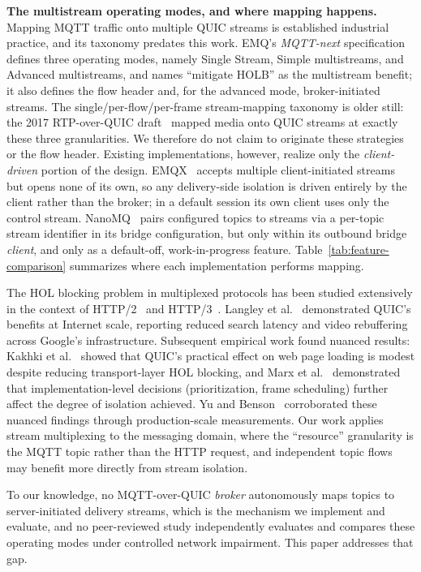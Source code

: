 \documentclass[a4paper,fleqn]{cas-dc}
\begin{document}
\textbf{The multistream operating modes, and where mapping happens.} Mapping MQTT traffic onto multiple QUIC streams is established industrial practice, and its taxonomy predates this work. EMQ's \emph{MQTT-next} specification~\cite{yang2024mqttnext} defines three operating modes, namely Single Stream, Simple multistreams, and Advanced multistreams, and names ``mitigate HOLB'' as the multistream benefit; it also defines the flow header and, for the advanced mode, broker-initiated streams. The single/per-flow/per-frame stream-mapping taxonomy is older still: the 2017 RTP-over-QUIC draft~\cite{rtpfolks2017} mapped media onto QUIC streams at exactly these three granularities. We therefore do not claim to originate these strategies or the flow header. Existing implementations, however, realize only the \emph{client-driven} portion of the design. EMQX~\cite{emqx} accepts multiple client-initiated streams but opens none of its own, so any delivery-side isolation is driven entirely by the client rather than the broker; in a default session its own client uses only the control stream. NanoMQ~\cite{nanomq-quic} pairs configured topics to streams via a per-topic stream identifier in its bridge configuration, but only within its outbound bridge \emph{client}, and only as a default-off, work-in-progress feature. Table~\ref{tab:feature-comparison} summarizes where each implementation performs mapping.

The HOL blocking problem in multiplexed protocols has been studied extensively in the context of HTTP/2~\cite{rfc7540} and HTTP/3~\cite{rfc9114}. Langley et al.~\cite{langley2017quic} demonstrated QUIC's benefits at Internet scale, reporting reduced search latency and video rebuffering across Google's infrastructure. Subsequent empirical work found nuanced results: Kakhki et al.~\cite{kakhki2017quic} showed that QUIC's practical effect on web page loading is modest despite reducing transport-layer HOL blocking, and Marx et al.~\cite{marx2020hol} demonstrated that implementation-level decisions (prioritization, frame scheduling) further affect the degree of isolation achieved. Yu and Benson~\cite{yu2021quic} corroborated these nuanced findings through production-scale measurements. Our work applies stream multiplexing to the messaging domain, where the ``resource'' granularity is the MQTT topic rather than the HTTP request, and independent topic flows may benefit more directly from stream isolation.

To our knowledge, no MQTT-over-QUIC \emph{broker} autonomously maps topics to server-initiated delivery streams, which is the mechanism we implement and evaluate, and no peer-reviewed study independently evaluates and compares these operating modes under controlled network impairment. This paper addresses that gap.
\end{document}
